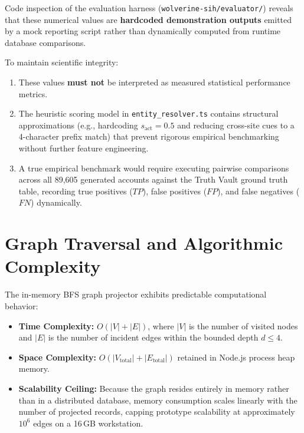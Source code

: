 Code inspection of the evaluation harness (\texttt{wolverine-sih/evaluator/}) reveals that these numerical values are \textbf{hardcoded demonstration outputs} emitted by a mock reporting script rather than dynamically computed from runtime database comparisons. 

To maintain scientific integrity:
\begin{enumerate}
    \item These values \textbf{must not} be interpreted as measured statistical performance metrics.
    \item The heuristic scoring model in \texttt{entity\_resolver.ts} contains structural approximations (e.g., hardcoding $s_{\text{act}} = 0.5$ and reducing cross-site cues to a 4-character prefix match) that prevent rigorous empirical benchmarking without further feature engineering.
    \item A true empirical benchmark would require executing pairwise comparisons across all 89,605 generated accounts against the Truth Vault ground truth table, recording true positives ($TP$), false positives ($FP$), and false negatives ($FN$) dynamically.
\end{enumerate}

\section{Graph Traversal and Algorithmic Complexity}
\label{sec:eval-graph}
The in-memory BFS graph projector exhibits predictable computational behavior:
\begin{itemize}
    \item \textbf{Time Complexity:} $O(|V| + |E|)$, where $|V|$ is the number of visited nodes and $|E|$ is the number of incident edges within the bounded depth $d \le 4$.
    \item \textbf{Space Complexity:} $O(|V_{\text{total}}| + |E_{\text{total}}|)$ retained in Node.js process heap memory.
    \item \textbf{Scalability Ceiling:} Because the graph resides entirely in memory rather than in a distributed database, memory consumption scales linearly with the number of projected records, capping prototype scalability at approximately $10^6$ edges on a 16\,GB workstation.
\end{itemize}

